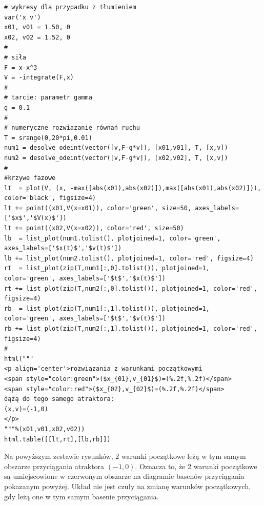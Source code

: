 \documentclass[a4paper,12pt,polish]{sphinxmanual}
\begin{document}
\begin{verbatim}
# wykresy dla przypadku z tłumieniem
var('x v')
x01, v01 = 1.50, 0
x02, v02 = 1.52, 0
#
# siła
F = x-x^3
V = -integrate(F,x)
#
# tarcie: parametr gamma
g = 0.1
#
# numeryczne rozwiazanie równań ruchu
T = srange(0,20*pi,0.01)
num1 = desolve_odeint(vector([v,F-g*v]), [x01,v01], T, [x,v])
num2 = desolve_odeint(vector([v,F-g*v]), [x02,v02], T, [x,v])
#
#krzywe fazowe
lt  = plot(V, (x, -max([abs(x01),abs(x02)]),max([abs(x01),abs(x02)])), color='black', figsize=4)
lt += point((x01,V(x=x01)), color='green', size=50, axes_labels=['$x$','$V(x)$'])
lt += point((x02,V(x=x02)), color='red', size=50)
lb  = list_plot(num1.tolist(), plotjoined=1, color='green', axes_labels=['$x(t)$','$v(t)$'])
lb += list_plot(num2.tolist(), plotjoined=1, color='red', figsize=4)
rt  = list_plot(zip(T,num1[:,0].tolist()), plotjoined=1, color='green', axes_labels=['$t$','$x(t)$'])
rt += list_plot(zip(T,num2[:,0].tolist()), plotjoined=1, color='red', figsize=4)
rb  = list_plot(zip(T,num1[:,1].tolist()), plotjoined=1, color='green', axes_labels=['$t$','$v(t)$'])
rb += list_plot(zip(T,num2[:,1].tolist()), plotjoined=1, color='red', figsize=4)
#
html("""
<p align='center'>rozwiązania z warunkami początkowymi
<span style="color:green">($x_{01},v_{01}$)=(%.2f,%.2f)</span>
<span style="color:red">($x_{02},v_{02}$)=(%.2f,%.2f)</span>
dążą do tego samego atraktora:
(x,v)=(-1,0)
</p>
"""%(x01,v01,x02,v02))
html.table([[lt,rt],[lb,rb]])
\end{verbatim}


Na powyższym zestawie rysunków,  2 warunki początkowe leżą w tym samym obszarze  przyciągania  atraktora $(-1, 0)$. Oznacza to, że 2 warunki początkowe są umiejscowione w czerwonym obszarze na diagramie basenów przyciągania pokazanym powyżej. Układ nie jest czuły na zmianę warunków początkowych, gdy leżą one w tym samym basenie przyciągania.
\end{document}
